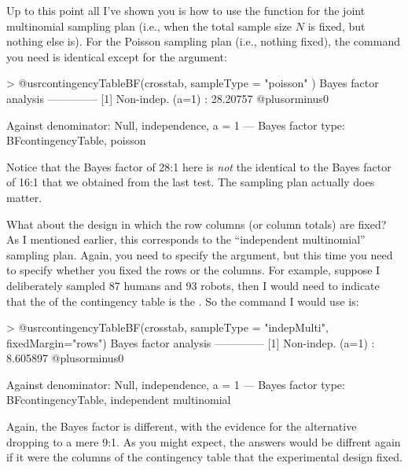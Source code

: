 Up to this point all I've shown you is how to use the  function for the joint multinomial sampling plan (i.e., when the total sample size $N$ is fixed, but nothing else is). For the Poisson sampling plan (i.e., nothing fixed), the command you need is identical except for the  argument:
\begin{rblock1}
> @usr{contingencyTableBF(crosstab, sampleType = "poisson" )}
Bayes factor analysis
--------------
[1] Non-indep. (a=1) : 28.20757 @plusorminus0%

Against denominator:
  Null, independence, a = 1 
---
Bayes factor type: BFcontingencyTable, poisson
\end{rblock1}
Notice that the Bayes factor of 28:1 here is {\it not} the identical to the Bayes factor of 16:1 that we obtained from the last test. The sampling plan actually does matter. 

What about the design in which the row columns (or column totals) are fixed? As I mentioned earlier, this corresponds to the ``independent multinomial'' sampling plan. Again, you need to specify the  argument, but this time you need to specify whether you fixed the rows or the columns. For example, suppose I deliberately sampled 87 humans and 93 robots, then I would need to indicate that the  of the contingency table is the . So the command I would use is:

\begin{rblock1}
> @usr{contingencyTableBF(crosstab, sampleType = "indepMulti", fixedMargin="rows")}
Bayes factor analysis
--------------
[1] Non-indep. (a=1) : 8.605897 @plusorminus0%

Against denominator:
  Null, independence, a = 1 
---
Bayes factor type: BFcontingencyTable, independent multinomial
\end{rblock1}
Again, the Bayes factor is different, with the evidence for the alternative dropping to a mere 9:1. As you might expect, the answers would be diffrent again if it were the columns of the contingency table that the experimental design fixed. 


